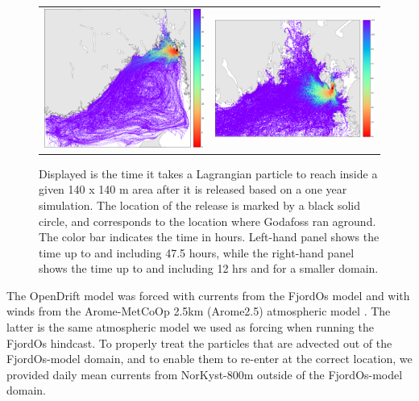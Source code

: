 \begin{figure}[hb]
  \begin{center}
    \begin{tabular}{cc}
      \includegraphics*[width=7.2cm]{Figurer/opendrift/opendrift_godafoss_shortest_time_crop}  & \includegraphics*[width=7.2cm]{Figurer/opendrift/opendrift_godafoss_shortest_time_zoom_crop}\\ 
    \end{tabular}
    \caption{\small Displayed is the time it takes a Lagrangian particle to reach inside a given 140 x 140 m area after it is released based on a one year simulation. The location of the release is marked by a black solid circle, and corresponds to the location where Godafoss ran aground. The color bar indicates the time in hours. Left-hand panel shows the time up to and including 47.5 hours, while the right-hand panel shows the time up to and including 12 hrs and for a smaller domain.}
    \label{fig:opendrift_godafoss_time}
  \end{center}
\end{figure}

The OpenDrift model was forced with currents from the FjordOs model and with winds from the Arome-MetCoOp 2.5km (Arome2.5) atmospheric model \citep{mulle:etal:2017}. The latter is the same atmospheric model we used as forcing when running the FjordOs hindcast. To properly treat the particles that are advected out of the FjordOs-model domain, and to enable them to re-enter at the correct location, we provided daily mean currents from NorKyst-800m outside of the FjordOs-model domain. 

